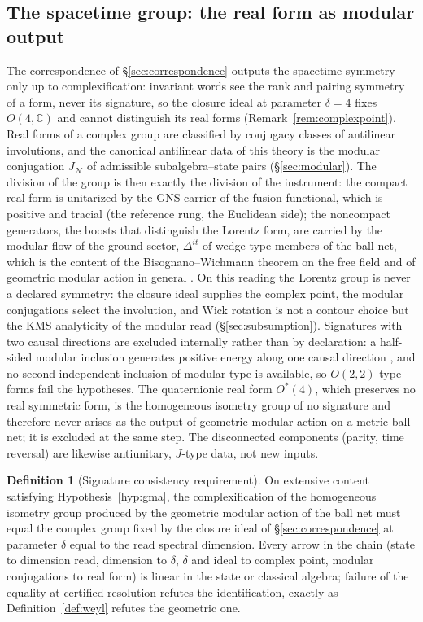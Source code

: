 \documentclass[11pt]{article}
\theoremstyle{definition}
\newtheorem{definition}[theorem]{Definition}
\theoremstyle{remark}
\begin{document}
\subsection{The spacetime group: the real form as modular output}
\label{sec:realform}
The correspondence of \S\ref{sec:correspondence} outputs the spacetime
symmetry only up to complexification: invariant words see the rank and
pairing symmetry of a form, never its signature, so the closure ideal
at parameter $\delta = 4$ fixes $O(4,\mathbb C)$ and cannot distinguish
its real forms (Remark~\ref{rem:complexpoint}).  Real forms of a
complex group are classified by conjugacy classes of antilinear
involutions, and the canonical antilinear data of this theory is the
modular conjugation $J_{\mathcal N}$ of admissible subalgebra--state
pairs (\S\ref{sec:modular}).  The division of the group is then exactly
the division of the instrument: the compact real form is unitarized by
the GNS carrier of the fusion functional, which is positive and tracial
(the reference rung, the Euclidean side); the noncompact generators,
the boosts that distinguish the Lorentz form, are carried by the
modular flow of the ground sector, $\Delta^{it}$ of wedge-type members
of the ball net, which is the content of the Bisognano--Wichmann
theorem on the free field \cite{bisognano} and of geometric modular
action in general \cite{summers}.  On this reading the Lorentz group is
never a declared symmetry: the closure ideal supplies the complex
point, the modular conjugations select the involution, and Wick
rotation is not a contour choice but the KMS analyticity of the modular
read (\S\ref{sec:subsumption}).  Signatures with two causal directions
are excluded internally rather than by declaration: a half-sided
modular inclusion generates positive energy along one causal direction
\cite{wiesbrock}, and no second independent inclusion of modular type
is available, so $O(2,2)$-type forms fail the hypotheses.  The
quaternionic real form $O^*(4)$, which preserves no real symmetric
form, is the homogeneous isometry group of no signature and therefore
never arises as the output of geometric modular action on a metric
ball net; it is excluded at the same step.  The
disconnected components (parity, time reversal) are likewise
antiunitary, $J$-type data, not new inputs.

\begin{definition}[Signature consistency requirement]
\label{def:signature}
On extensive content satisfying Hypothesis~\ref{hyp:gma}, the
complexification of the homogeneous isometry group produced by the
geometric modular action of the ball net must equal the complex group
fixed by the closure ideal of \S\ref{sec:correspondence} at parameter
$\delta$ equal to the read spectral dimension.  Every arrow in the
chain (state to dimension read, dimension to $\delta$, $\delta$ and
ideal to complex point, modular conjugations to real form) is linear in
the state or classical algebra; failure of the equality at certified
resolution refutes the identification, exactly as
Definition~\ref{def:weyl} refutes the geometric one.
\end{definition}
\end{document}
